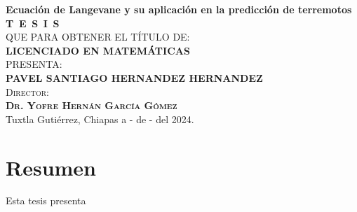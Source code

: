 \documentclass[
  spanish,
  us-letterpaper,
]{scrreprt}
\renewcommand*\contentsname{Tabla de contenidos}
\newcommand\contentsname{Tabla de contenidos}
\theoremstyle{plain}
\theoremstyle{plain}
\theoremstyle{definition}
\theoremstyle{plain}
\theoremstyle{remark}
\begin{document}
\begin{titlepage}
\begin{minipage}[t][0.95\textheight][c]{0.76\textwidth}
            \begin{center}
                {\Large\bfseries Ecuación de Langevane y su aplicación en la predicción de terremotos}\\[2cm]
                \textsc{\huge \textbf{T\, E\, S\, I\, S}}\\[1.5cm]
                \textsc{\large QUE PARA OBTENER EL TÍTULO DE:}\\[0.3cm]
                \textbf{\textsc{LICENCIADO EN MATEMÁTICAS}}\\[1.5cm]
                \textsc{\large PRESENTA:}\\[0.3cm]
                \textbf{\textsc{\large {PAVEL SANTIAGO HERNANDEZ HERNANDEZ}}}\\[2cm]
                {\large\scshape Director:\\[0.3cm]
                {\textbf{\large Dr. Yofre Hernán García Gómez }}}\\[2.0cm]
                \large{Tuxtla Gutiérrez, Chiapas a - de - del 2024.}

            \end{center}
\end{minipage}
\end{titlepage}





\renewcommand*\contentsname{Tabla de contenidos}
{
\hypersetup{linkcolor=}
\setcounter{tocdepth}{2}
\tableofcontents
}


\chapter*{Resumen}\label{resumen}


Esta tesis presenta

\end{document}
